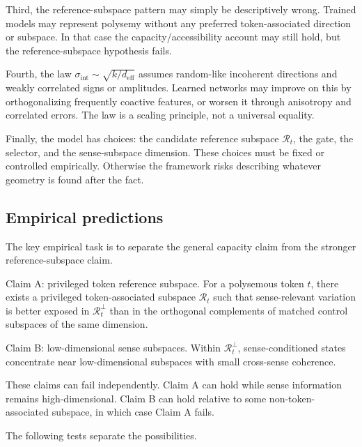 \documentclass[
  aps,
  reprint,
  superscriptaddress,
  floatfix,
  nofootinbib,
  longbibliography
]{revtex4-2}
\newcommand{\deff}{d_{\mathrm{eff}}}
\newcommand{\sint}{\sigma_{\mathrm{int}}}
\begin{document}
Third, the reference-subspace pattern may simply be descriptively wrong. Trained
models may represent polysemy without any preferred token-associated
direction or subspace. In that case the capacity/accessibility
account may still hold, but the reference-subspace hypothesis fails.

Fourth, the law $\sint\sim\sqrt{k/\deff}$ assumes random-like
incoherent directions and weakly correlated signs or amplitudes.
Learned networks may improve on this by orthogonalizing frequently
coactive features, or worsen it through anisotropy and correlated
errors. The law is a scaling principle, not a universal equality.

Finally, the model has choices: the candidate reference subspace
$\mathcal R_t$, the gate, the selector, and the sense-subspace dimension.
These choices must be fixed or controlled empirically. Otherwise the
framework risks describing whatever geometry is found after the fact.

\subsection{Empirical predictions}
\label{sec:predictions}

The key empirical task is to separate the general capacity claim from
the stronger reference-subspace claim.

{Claim A: privileged token reference subspace.}
For a polysemous token $t$, there exists a privileged token-associated
subspace $\mathcal R_t$ such that sense-relevant variation is better
exposed in $\mathcal R_t^\perp$ than in the orthogonal complements of
matched control subspaces of the same dimension.

{Claim B: low-dimensional sense subspaces.}
Within $\mathcal R_t^\perp$,
sense-conditioned states concentrate near low-dimensional subspaces
with small cross-sense coherence.

These claims can fail independently. Claim A can hold while sense
information remains high-dimensional. Claim B can hold relative to some
non-token-associated subspace, in which case Claim A fails.

The following tests separate the possibilities.
\end{document}
